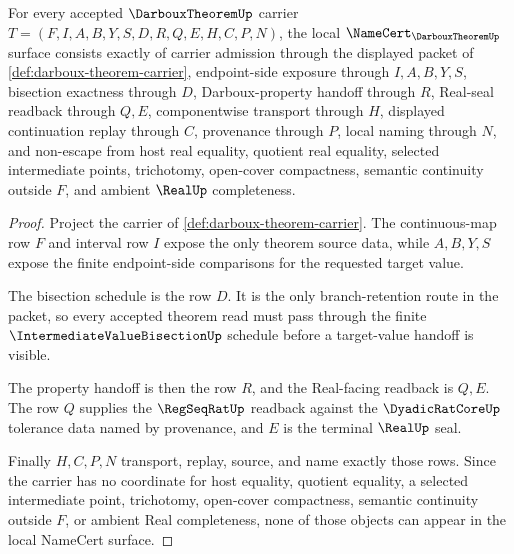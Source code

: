 \begin{theorem}
\label{thm:darboux-theorem-namecert-obligations}
For every accepted $\DarbouxTheoremUp$ carrier $T=(F,I,A,B,Y,S,D,R,Q,E,H,C,P,N)$, the local $\NameCert_{\DarbouxTheoremUp}$ surface consists exactly of carrier admission through the displayed packet of \autoref{def:darboux-theorem-carrier}, endpoint-side exposure through $I,A,B,Y,S$, bisection exactness through $D$, Darboux-property handoff through $R$, Real-seal readback through $Q,E$, componentwise transport through $H$, displayed continuation replay through $C$, provenance through $P$, local naming through $N$, and non-escape from host real equality, quotient real equality, selected intermediate points, trichotomy, open-cover compactness, semantic continuity outside $F$, and ambient $\RealUp$ completeness.
\end{theorem}
\begin{proof}
Project the carrier of \autoref{def:darboux-theorem-carrier}. The continuous-map row $F$ and interval row $I$ expose the only theorem source data, while $A,B,Y,S$ expose the finite endpoint-side comparisons for the requested target value.

The bisection schedule is the row $D$. It is the only branch-retention route in the packet, so every accepted theorem read must pass through the finite $\IntermediateValueBisectionUp$ schedule before a target-value handoff is visible.

The property handoff is then the row $R$, and the Real-facing readback is $Q,E$. The row $Q$ supplies the $\RegSeqRatUp$ readback against the $\DyadicRatCoreUp$ tolerance data named by provenance, and $E$ is the terminal $\RealUp$ seal.

Finally $H,C,P,N$ transport, replay, source, and name exactly those rows. Since the carrier has no coordinate for host equality, quotient equality, a selected intermediate point, trichotomy, open-cover compactness, semantic continuity outside $F$, or ambient Real completeness, none of those objects can appear in the local NameCert surface.
\end{proof}

